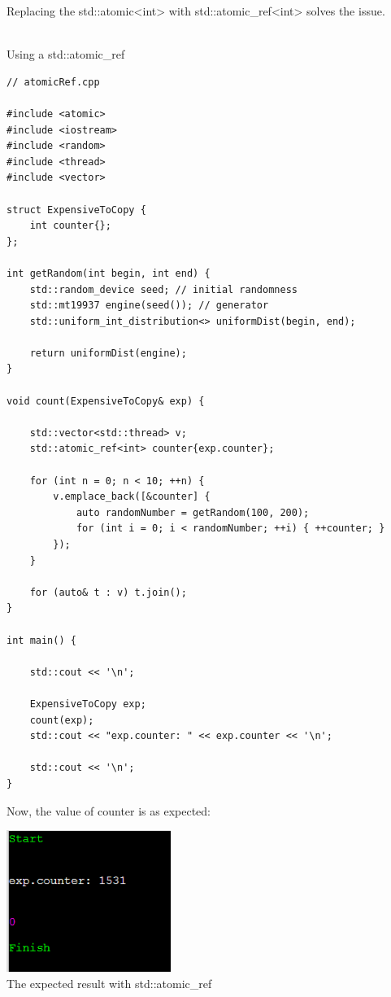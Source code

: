 Replacing the std::atomic<int> with std::atomic\_ref<int> solves the issue.

\hspace*{\fill} \\ %
\noindent
Using a std::atomic\_ref
\begin{lstlisting}[style=styleCXX]
// atomicRef.cpp

#include <atomic>
#include <iostream>
#include <random>
#include <thread>
#include <vector>

struct ExpensiveToCopy {
	int counter{};
};

int getRandom(int begin, int end) {
	std::random_device seed; // initial randomness
	std::mt19937 engine(seed()); // generator
	std::uniform_int_distribution<> uniformDist(begin, end);
	
	return uniformDist(engine);
}

void count(ExpensiveToCopy& exp) {
	
	std::vector<std::thread> v;
	std::atomic_ref<int> counter{exp.counter};
	
	for (int n = 0; n < 10; ++n) {
		v.emplace_back([&counter] {
			auto randomNumber = getRandom(100, 200);
			for (int i = 0; i < randomNumber; ++i) { ++counter; }
		});
	}

	for (auto& t : v) t.join();
}

int main() {
	
	std::cout << '\n';
	
	ExpensiveToCopy exp;
	count(exp);
	std::cout << "exp.counter: " << exp.counter << '\n';
	
	std::cout << '\n';
}
\end{lstlisting}

Now, the value of counter is as expected:

\begin{center}
\includegraphics[width=0.4\textwidth]{content/3/chapter6/images/10.png}\\
The expected result with std::atomic\_ref
\end{center}

